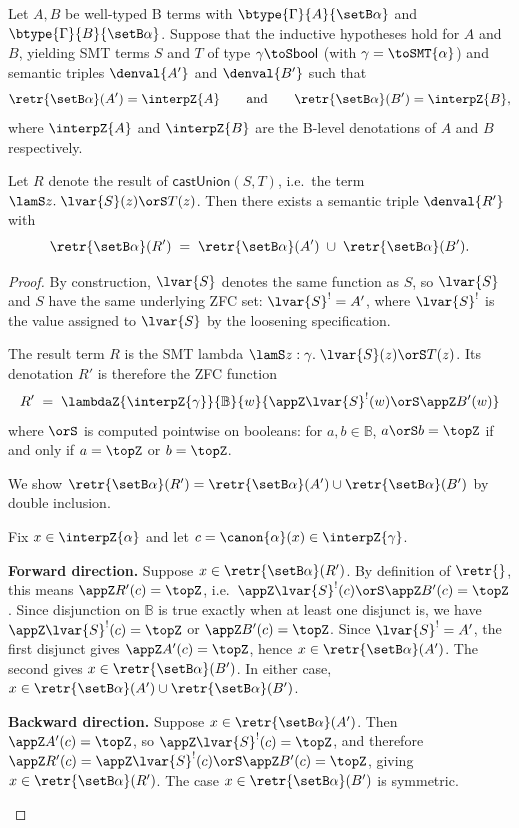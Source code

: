 \begin{theorem}
  Let $A, B$ be well-typed B terms with $\btype{\Gamma}{A}{\setB \alpha}$ and $\btype{\Gamma}{B}{\setB \alpha}$.
  Suppose that the inductive hypotheses hold for $A$ and $B$, yielding SMT terms $S$ and $T$ of type $\gamma \toS \mathsf{bool}$ (with $\gamma = \toSMT{\alpha}$) and semantic triples
  $\denval{A'}$ and $\denval{B'}$ such that
  \[
    \retr{\setB \alpha}(A') = \interpZ{A}
    \qquad\text{and}\qquad
    \retr{\setB \alpha}(B') = \interpZ{B},
  \]
  where $\interpZ{A}$ and $\interpZ{B}$ are the B-level denotations of $A$ and $B$ respectively.

  Let $R$ denote the result of $\mathsf{castUnion}(S,T)$, i.e.\ the term $\lamS z.\; \lvar{S}(z) \orS T(z)$.
  Then there exists a semantic triple $\denval{R'}$ with
  \[
    \retr{\setB \alpha}(R')
    \;=\;
    \retr{\setB \alpha}(A')
    \;\cup\;
    \retr{\setB \alpha}(B').
  \]
\end{theorem}

\begin{proof}
  By construction, $\lvar{S}$ denotes the same function as $S$, so
  $\lvar{S}$ and $S$ have the same underlying ZFC set: $\lvar{S}^! = A'$, where $\lvar{S}^!$ is the value assigned to $\lvar{S}$ by the loosening specification.

  The result term $R$ is the SMT lambda $\lamS z : \gamma.\; \lvar{S}(z) \orS T(z)$.
  Its denotation $R'$ is therefore the ZFC function
  \[
    R' \;=\; \lambdaZ{\interpZ{\gamma}}{\mathbb{B}}{w}{\appZ \lvar{S}^!(w) \orS \appZ B'(w)}
  \]
  where $\orS$ is computed pointwise on booleans: for $a, b \in \mathbb{B}$, $a \orS b = \topZ$ if and only if $a = \topZ$ or $b = \topZ$.

  We show $\retr{\setB \alpha}(R') = \retr{\setB \alpha}(A') \cup \retr{\setB \alpha}(B')$ by double inclusion.

  \begin{subproof}
  Fix $x \in \interpZ{\alpha}$ and let $c = \canon{\alpha}(x) \in \interpZ{\gamma}$.

  \textbf{Forward direction.}
  Suppose $x \in \retr{\setB \alpha}(R')$.
  By definition of $\retr{}$, this means $\appZ R'(c) = \topZ$, i.e.\ $\appZ \lvar{S}^!(c) \orS \appZ B'(c) = \topZ$.
  Since disjunction on $\mathbb{B}$ is true exactly when at least one disjunct is, we have
  $\appZ \lvar{S}^!(c) = \topZ$ or $\appZ B'(c) = \topZ$.
  Since $\lvar{S}^! = A'$, the first disjunct gives $\appZ A'(c) = \topZ$, hence $x \in \retr{\setB \alpha}(A')$.
  The second gives $x \in \retr{\setB \alpha}(B')$.
  In either case, $x \in \retr{\setB \alpha}(A') \cup \retr{\setB \alpha}(B')$.

  \textbf{Backward direction.}
  Suppose $x \in \retr{\setB \alpha}(A')$.
  Then $\appZ A'(c) = \topZ$, so $\appZ \lvar{S}^!(c) = \topZ$, and therefore $\appZ R'(c) = \appZ \lvar{S}^!(c) \orS \appZ B'(c) = \topZ$, giving $x \in \retr{\setB \alpha}(R')$.
  The case $x \in \retr{\setB \alpha}(B')$ is symmetric.
  \end{subproof}
\end{proof}

